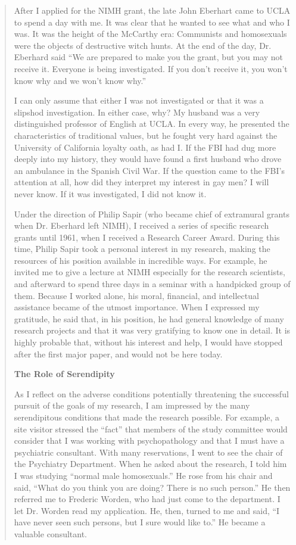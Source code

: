 \begin{refsection}
\begin{quote}
After I applied for the NIMH grant, the late John Eberhart came to UCLA to spend a day with me. It was clear that he wanted to see what and who I was. It was the height of the McCarthy era: Communists and homosexuals were the objects of destructive witch hunts. At the end of the day, Dr. Eberhard said ``We are prepared to make you the grant, but you may not receive it. Everyone is being investigated. If you don't receive it, you won't know why and we won't know why.''

I can only assume that either I was not investigated or that it was a slipshod investigation. In either case, why? My husband was a very distinguished professor of English at UCLA. In every way, he presented the characteristics of traditional values, but he fought very hard against the University of California loyalty oath, as had I. If the FBI had dug more deeply into my history, they would have found a first husband who drove an ambulance in the Spanish Civil War. If the question came to the FBI's attention at all, how did they interpret my interest in gay men? I will never know. If it was investigated, I did not know it.

Under the direction of Philip Sapir (who became chief of extramural grants when Dr. Eberhard left NIMH), I received a series of specific research grants until 1961, when I received a Research Career Award. During this time, Philip Sapir took a personal interest in my research, making the resources of his position available in incredible ways. For example, he invited me to give a lecture at NIMH especially for the research scientists, and afterward to spend three days in a seminar with a handpicked group of them. Because I worked alone, his moral, financial, and intellectual assistance became of the utmost importance. When I expressed my gratitude, he said that, in his position, he had general knowledge of many research projects and that it was very gratifying to know one in detail. It is highly probable that, without his interest and help, I would have stopped after the first major paper, and would not be here today.

\textbf{The Role of Serendipity} 

As I reflect on the adverse conditions potentially threatening the successful pursuit of the goals of my research, I am impressed by the many serendipitous conditions that made the research possible. For example, a site visitor stressed the ``fact'' that members of the study committee would consider that I was working with psychopathology and that I must have a psychiatric consultant. With many reservations, I went to see the chair of the Psychiatry Department. When he asked about the research, I told him I was studying ``normal male homosexuals.'' He rose from his chair and said, ``What do you think you are doing? There is no such person.'' He then referred me to Frederic Worden, who had just come to the department. I let Dr. Worden read my application. He, then, turned to me and said, ``I have never seen such persons, but I sure would like to.'' He became a valuable consultant.


\end{quote}
\end{refsection}
